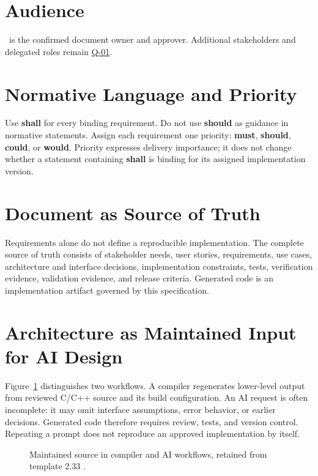\section{Audience}
\DocumentOwner\ is the confirmed document owner and approver. Additional
stakeholders and delegated roles remain \hyperref[Question:Q-01]{Q-01}.

\section{Normative Language and Priority}
Use \textbf{shall} for every binding requirement. Do not use \textbf{should} as
guidance in normative statements. Assign each requirement one priority:
\textbf{\gls{must}}, \textbf{\gls{should}}, \textbf{\gls{could}}, or
\textbf{\gls{would}}. Priority expresses delivery importance; it does not change
whether a statement containing \textbf{shall} is binding for its assigned
implementation version.

\section{Document as Source of Truth}
Requirements alone do not define a reproducible implementation. The complete
source of truth consists of stakeholder needs, user stories, requirements, use
cases, architecture and interface decisions, implementation constraints,
tests, verification evidence, validation evidence, and release criteria.
Generated code is an implementation artifact governed by this specification.

\section{Architecture as Maintained Input for AI Design}
\label{Section:ArchitectureAIDesign}
Figure~\ref{Figure:MaintainedSourceComparison} distinguishes two workflows.
A compiler regenerates lower-level output from reviewed C/C++ source and its
build configuration. An AI request is often incomplete: it may omit interface
assumptions, error behavior, or earlier decisions. Generated code therefore
requires review, tests, and version control. Repeating a prompt does not
reproduce an approved implementation by itself.

\begin{figure}[htbp]
\centering
\resizebox{\textwidth}{!}{}
\caption{Maintained source in compiler and AI workflows, retained from template 2.33 \cite{ArchitectureDesignTemplate233}.}
\label{Figure:MaintainedSourceComparison}
\end{figure}


